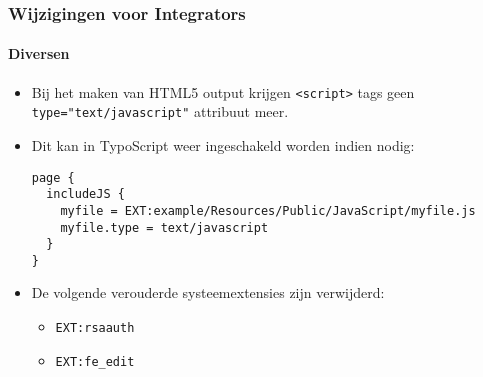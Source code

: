 \begin{frame}[fragile]
	\frametitle{Wijzigingen voor Integrators}
	\framesubtitle{Diversen}

	\lstset{basicstyle=\tiny\ttfamily}

	\begin{itemize}

		\item Bij het maken van HTML5 output krijgen \texttt{<script>} tags geen
			\texttt{type="text/javascript"} attribuut meer.

		\item Dit kan in TypoScript weer ingeschakeld worden indien nodig:

\begin{lstlisting}
page {
  includeJS {
    myfile = EXT:example/Resources/Public/JavaScript/myfile.js
    myfile.type = text/javascript
  }
}
\end{lstlisting}

		\item De volgende verouderde systeemextensies zijn verwijderd:

			\begin{itemize}
				\item \texttt{EXT:rsaauth}
				\item \texttt{EXT:fe\_edit}
			\end{itemize}

	\end{itemize}

\end{frame}


